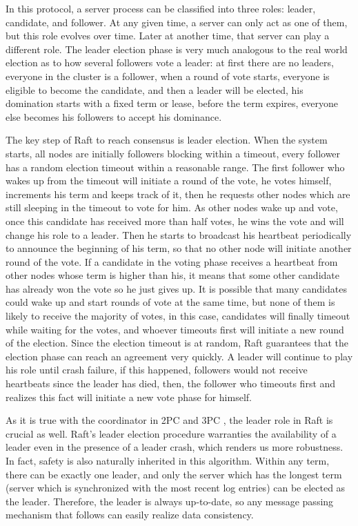\documentclass[11pt]{article}
\begin{document}
    In this protocol, a server process can be classified into three roles: leader, candidate, and follower. At any given time, a server can only act as one of them, but this role evolves over time. Later at another time, that server can play a different role. The leader election phase is very much analogous to the real world election as to how several followers vote a leader: at first there are no leaders, everyone in the cluster is a follower, when a round of vote starts, everyone is eligible to become the candidate, and then a leader will be elected, his domination starts with a fixed term or lease, before the term expires, everyone else becomes his followers to accept his dominance.

    The key step of Raft to reach consensus is leader election. When the system starts, all nodes are initially followers blocking within a timeout, every follower has a random election timeout within a reasonable range. The first follower who wakes up from the timeout will initiate a round of the vote, he votes himself, increments his term and keeps track of it, then he requests other nodes which are still sleeping in the timeout to vote for him. As other nodes wake up and vote, once this candidate has received more than half votes, he wins the vote and will change his role to a leader. Then he starts to broadcast his heartbeat periodically to announce the beginning of his term, so that no other node will initiate another round of the vote. If a candidate in the voting phase receives a heartbeat from other nodes whose term is higher than his, it means that some other candidate has already won the vote so he just gives up. It is possible that many candidates could wake up and start rounds of vote at the same time, but none of them is likely to receive the majority of votes, in this case, candidates will finally timeout while waiting for the votes, and whoever timeouts first will initiate a new round of the election. Since the election timeout is at random, Raft guarantees that the election phase can reach an agreement very quickly. A leader will continue to play his role until crash failure, if this happened, followers would not receive heartbeats since the leader has died, then, the follower who timeouts first and realizes this fact will initiate a new vote phase for himself.

    As it is true with the coordinator in \small{2PC} \normalsize and \small{3PC} \normalsize, the leader role in Raft is crucial as well. Raft's leader election procedure warranties the availability of a leader even in the presence of a leader crash, which renders us more robustness. In fact, safety is also naturally inherited in this algorithm. Within any term, there can be exactly one leader, and only the server which has the longest term (server which is synchronized with the most recent log entries) can be elected as the leader. Therefore, the leader is always up-to-date, so any message passing mechanism that follows can easily realize data consistency.
\end{document}
